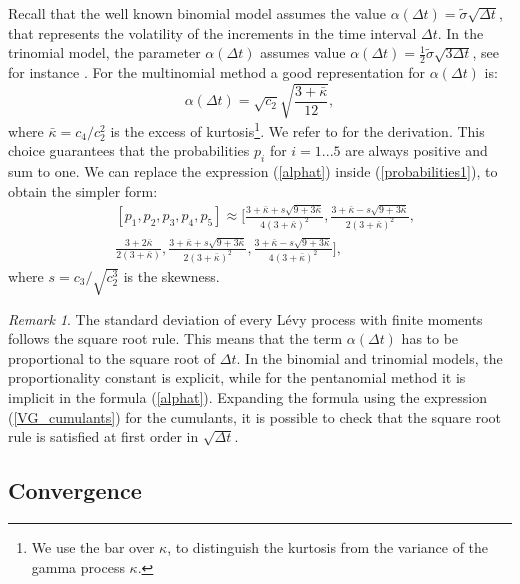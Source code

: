 \documentclass[]{interact}
\theoremstyle{plain}%
\theoremstyle{definition}
\theoremstyle{remark}
\newtheorem{remark}{Remark}
\begin{document}
Recall that the well known binomial model \cite{CRR79} assumes the value $\alpha(\Delta t) = \tilde \sigma \sqrt{\Delta t}$,
that represents the volatility of the increments in the time interval $\Delta t$.
In the trinomial model, the parameter $\alpha(\Delta t)$ assumes value $\alpha(\Delta t) = \frac{1}{2} \tilde \sigma \sqrt{3\Delta t}$, see for instance \cite{YaPr01}.
For the multinomial method a good representation for $\alpha(\Delta t)$ is:
\begin{equation}\label{alphat}
 \alpha(\Delta t) = \sqrt{c_2} \sqrt{\frac{3+\bar \kappa}{12}},
\end{equation}
where $\bar \kappa = c_4 / c_2^2$ is the excess of kurtosis\footnote{We use the bar over $\kappa$, 
to distinguish the kurtosis from the variance of the gamma process $\kappa$.}. 
We refer to \cite{YaPr06} for the derivation.
This choice guarantees that the probabilities $p_i$ for $i=1...5$ are always positive and sum to one. We can replace the expression
(\ref{alphat}) inside (\ref{probabilities1}), to obtain the simpler form:
\begin{align}\label{probabilities2}
 & [p_1,p_2,p_3,p_4,p_5] \approx \biggl[ \frac{3+\bar \kappa+s\sqrt{9+3\bar \kappa}}{4(3+\bar \kappa)^2} , 
 \frac{3+\bar \kappa-s\sqrt{9+3\bar \kappa}}{2(3+\bar \kappa)^2} , \\ \nonumber
 &
 \frac{3+2\bar \kappa}{2(3+\bar \kappa)} ,
 \frac{3+\bar \kappa+s\sqrt{9+3\bar \kappa}}{2(3+\bar \kappa)^2} ,
 \frac{3+\bar \kappa-s\sqrt{9+3\bar \kappa}}{4(3+\bar \kappa)^2} \biggr],
\end{align}
where $s = c_3 / \sqrt{c_2^3}$ is the skewness.
\begin{remark}
 The standard deviation of every L\'{e}vy process with finite moments follows the square root rule. This means that the term $\alpha(\Delta t)$ has to be proportional
 to the square root of $\Delta t$. In the binomial and trinomial models, the proportionality constant is explicit, while for the pentanomial method it is implicit
 in the formula (\ref{alphat}). Expanding the formula using the expression (\ref{VG_cumulants}) for the cumulants, it is possible to check that the square root rule is
 satisfied at first order in $\sqrt{\Delta t}$.
\end{remark}



\subsection{Convergence}
\end{document}
